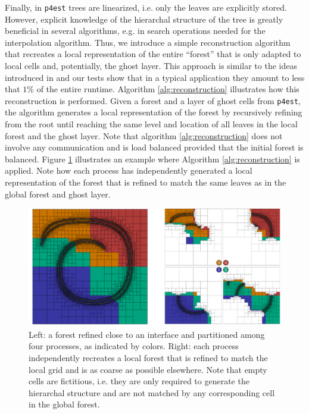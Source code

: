 Finally, in \texttt{p4est} trees are linearized, i.e. only the leaves are explicitly stored. However, explicit knowledge of the hierarchal structure of the tree is greatly beneficial in several algorithms, e.g. in search operations needed for the interpolation algorithm. Thus, we introduce a simple reconstruction algorithm that recreates a local representation of the entire ``forest'' that is only adapted to local cells and, potentially, the ghost layer. This approach is similar to the ideas introduced in \cite{Bangerth;Burstedde;Heister;etal:11:Algorithms-and-data-} and our tests show that in a typical application they amount to less that $1\%$ of the entire runtime. Algorithm \ref{alg:reconstruction} illustrates how this reconstruction is performed. Given a forest and a layer of ghost cells from \texttt{p4est}, the algorithm generates a local representation of the forest by recursively refining from the root until reaching the same level and location of all leaves in the local forest and the ghost layer. Note that algorithm \ref{alg:reconstruction} does not involve any communication and is load balanced provided that the initial forest is balanced. Figure \ref{fig:reconstruction} illustrates an example where Algorithm \ref{alg:reconstruction} is applied. Note how each process has independently generated a local representation of the forest that is refined to match the same leaves as in the global forest and ghost layer.
\begin{figure}[htbp]
\begin{center}
\includegraphics[width = \textwidth]{figures/reconstruct.pdf}
\end{center}
\caption{Left: a forest refined close to an interface and partitioned among four processes, as indicated by colors. Right: each process independently recreates a local forest that is refined to match the local grid and is as coarse as possible elsewhere. Note that empty cells are fictitious, i.e. they are only required to generate the hierarchal structure and are not matched by any corresponding cell in the global forest.}
\label{fig:reconstruction}
\end{figure}
